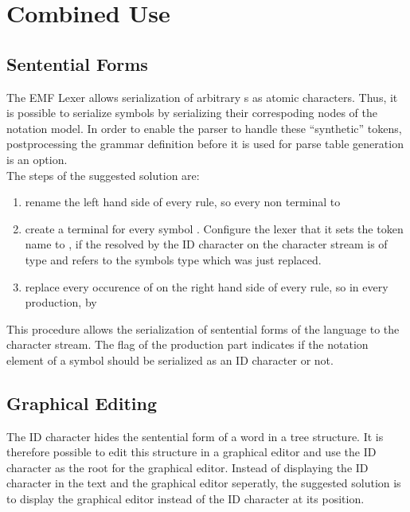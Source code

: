 \chapter{Combined Use}

\section{Sentential Forms}
The EMF Lexer  allows serialization of arbitrary s as atomic characters. Thus, it is possible to serialize symbols by serializing their correspoding nodes of the notation model. In order to enable the parser to handle these ``synthetic'' tokens, postprocessing the grammar definition before it is used for parse table generation is an option. \\
The steps of the suggested solution are:
\begin{enumerate}
	\item rename the left hand side of every rule, so every non terminal  to 
	\item create a terminal  for every symbol . Configure the lexer that it sets the token name to , if the  resolved by the ID character on the character stream is of type  and refers to the symbols type which was just replaced. 
	\item replace every occurence of  on the right hand side of every rule, so in every production, by 
\end{enumerate}

This procedure allows the serialization of sentential forms of the language to the character stream. The  flag of the production part indicates if the notation element of a symbol should be serialized as an ID character or not. 

\section{Graphical Editing}
The ID character hides the sentential form of a word in a tree structure. It is therefore possible to edit this structure in a graphical editor and use the ID character as the root for the graphical editor. Instead of displaying the ID character in the text and the graphical editor seperatly, the suggested solution is to display the graphical editor instead of the ID character at its position.

